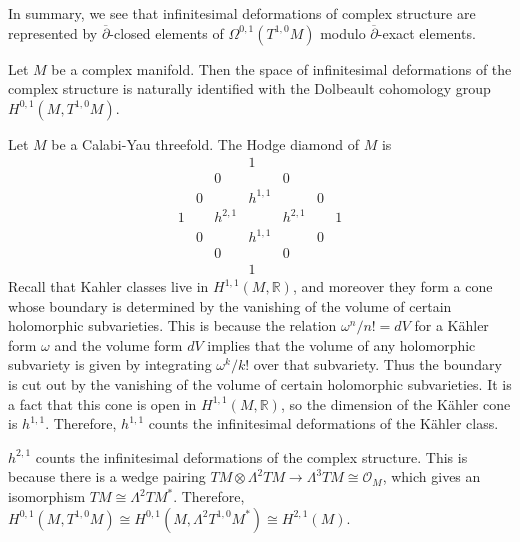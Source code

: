 \documentclass[12pt]{article}
\begin{document}
 In summary, we see that infinitesimal deformations of complex structure are represented by $\overline\partial$-closed elements of $\Omega^{0,1}(T^{1,0}M)$ modulo $\overline\partial$-exact elements.

\begin{theorem} Let $M$ be a complex manifold. Then the space of infinitesimal deformations of the complex structure is naturally identified with the Dolbeault cohomology group $H^{0,1}(M,T^{1,0}M)$.
\end{theorem}

\begin{example}
    Let $M$ be a Calabi-Yau threefold. The Hodge diamond of $M$ is
    \[
        \begin{matrix}
              &   &         & 1       &         &   &   \\
              &   & 0       &         & 0       &   &   \\
              & 0 &         & h^{1,1} &         & 0 &   \\
            1 &   & h^{2,1} &         & h^{2,1} &   & 1 \\
              & 0 &         & h^{1,1} &         & 0 &   \\
              &   & 0       &         & 0       &   &   \\
              &   &         & 1       &         &   &
        \end{matrix}
    \]
    Recall that Kahler classes live in $H^{1,1}(M,\mathbb{R})$, and moreover they form a cone whose boundary is determined by the vanishing of the volume of certain holomorphic subvarieties. This is because the relation $\omega^n/n! = dV$ for a Kähler form $\omega$ and the volume form $dV$ implies that the volume of any holomorphic subvariety is given by integrating $\omega^k/k!$ over that subvariety. Thus the boundary is cut out by the vanishing of the volume of certain holomorphic subvarieties. It is a fact that this cone is open in $H^{1,1}(M,\mathbb{R})$, so the dimension of the Kähler cone is $h^{1,1}$. Therefore, $h^{1,1}$ counts the infinitesimal deformations of the Kähler class.

    $h^{2,1}$ counts the infinitesimal deformations of the complex structure. This is because there is a wedge pairing $TM \otimes \Lambda^2 TM \to \Lambda^3 TM \cong \mathcal{O}_M$, which gives an isomorphism $TM \cong \Lambda^2 TM^*$. Therefore, $H^{0,1}(M,T^{1,0}M) \cong H^{0,1}(M,\Lambda^2 T^{1,0}M^*) \cong H^{2,1}(M)$.
\end{example}
\end{document}
